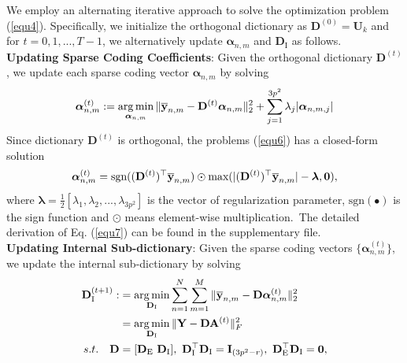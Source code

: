 \documentclass[10pt,twocolumn,letterpaper]{article}
\DeclareMathOperator*{\argmin}{arg\,min}
\begin{document}
We employ an alternating iterative approach to solve the optimization problem (\ref{equ4}). Specifically, we initialize the orthogonal dictionary as $\mathbf{D}^{(0)}=\mathbf{U}_{k}$ and for $t=0,1, ...,T-1$, we alternatively update $\bm{\alpha}_{n,m}$ and $\mathbf{D}_{\text{I}}$ as follows.
\vspace{2mm}\\
\textbf{Updating Sparse Coding Coefficients}: Given the orthogonal dictionary $\textbf{D}^{(t)}$, we update each sparse coding vector $\bm{\alpha}_{n,m}$ by solving
\vspace{-4mm}
\begin{equation}\label{equ6}\vspace{-2mm}
\begin{split}
\bm{\alpha}_{n,m}^{(t)}:=\argmin_{\bm{\alpha}_{n,m}}
\|\mathbf{\overline{y}}_{n,m}-\mathbf{D}^{(t)}\bm{\alpha}_{n,m}\|_{2}^{2}+\sum_{j=1}^{3p^{2}}\lambda_{j}|\bm{\alpha}_{n,m,j}|
\end{split}
\end{equation}
Since dictionary $\mathbf{D}^{(t)}$ is orthogonal, the problems (\ref{equ6}) has a closed-form solution
\vspace{-1mm}
\begin{equation}\label{equ7}\vspace{-0mm}
\bm{\alpha}_{n,m}^{(t)}= \text{sgn}((\mathbf{D}^{(t)})^{\top}\mathbf{\overline{y}}_{n,m})\odot \text{max}(|(\mathbf{D}^{(t)})^{\top}\mathbf{\overline{y}}_{n,m}|-\bm{\lambda},\mathbf{0}),
\end{equation}
where $\bm{\lambda} = \frac{1}{2}[\lambda_{1},\lambda_{2},...,\lambda_{3p^2}]$ is the vector of regularization parameter, $\text{sgn}(\bullet)$ is the sign function and $\odot$ means element-wise multiplication.\ The detailed derivation of Eq. (\ref{equ7}) can be found in the supplementary file.
\vspace{2mm}\\
\textbf{Updating Internal Sub-dictionary}: Given the sparse coding vectors $\{\bm{\alpha}_{n,m}^{(t)}\}$, we update the internal sub-dictionary by solving
\vspace{-3mm}
\begin{equation}\label{equ8} \vspace{-2mm}
\begin{split}
\textbf{D}_{\text{I}}^{(t+1)}
:
&
=
\argmin_{\textbf{D}_{\text{I}}}
\sum_{n=1}^{N}\sum_{m=1}^{M}\|\mathbf{\overline{y}}_{n,m}-\mathbf{D}\bm{\alpha}_{n,m}^{(t)}\|_{2}^{2}
\\
&
=
\argmin_{\textbf{D}_{\text{I}}}
\|\mathbf{Y}-\mathbf{D}\mathbf{A}^{(t)}\|_{F}^{2}
\\
s.t.
\quad
\mathbf{D}
&
=
[\mathbf{D}_{\text{E}}\ \mathbf{D}_{\text{I}}],\ \mathbf{D}_{\text{I}}^{\top}\mathbf{D}_{\text{I}} = \mathbf{I}_{(3p^2-r)},\ \mathbf{D}_{\text{E}}^{\top}\mathbf{D}_{\text{I}} = \mathbf{0},
\end{split}
\end{equation}
\end{document}
